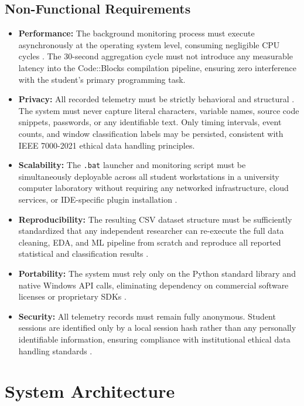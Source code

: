 \subsection{Non-Functional Requirements}
\begin{itemize}
    \item \textbf{Performance:} The background monitoring process must execute asynchronously at the operating system level, consuming negligible CPU cycles \cite{realtimeStress2012}. The 30-second aggregation cycle must not introduce any measurable latency into the Code::Blocks compilation pipeline, ensuring zero interference with the student's primary programming task.
    \item \textbf{Privacy:} All recorded telemetry must be strictly behavioral and structural \cite{ieee7000}. The system must never capture literal characters, variable names, source code snippets, passwords, or any identifiable text. Only timing intervals, event counts, and window classification labels may be persisted, consistent with IEEE 7000-2021 ethical data handling principles.
    \item \textbf{Scalability:} The \texttt{.bat} launcher and monitoring script must be simultaneously deployable across all student workstations in a university computer laboratory without requiring any networked infrastructure, cloud services, or IDE-specific plugin installation \cite{mdpi389}.
    \item \textbf{Reproducibility:} The resulting CSV dataset structure must be sufficiently standardized that any independent researcher can re-execute the full data cleaning, EDA, and ML pipeline from scratch and reproduce all reported statistical and classification results \cite{arean2025generalizable}.
    \item \textbf{Portability:} The system must rely only on the Python standard library and native Windows API calls, eliminating dependency on commercial software licenses or proprietary SDKs \cite{zhang2023keystroke}.
    \item \textbf{Security:} All telemetry records must remain fully anonymous. Student sessions are identified only by a local session hash rather than any personally identifiable information, ensuring compliance with institutional ethical data handling standards \cite{isoiec27001}.
\end{itemize}

\section{System Architecture}
\label{sec:system_architecture}

